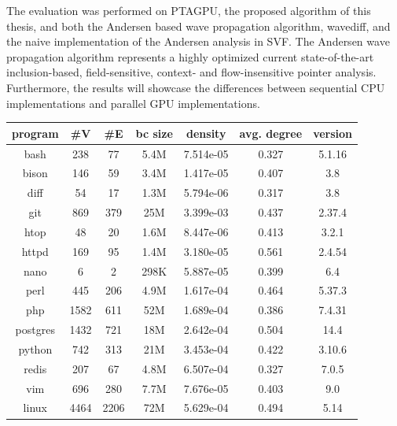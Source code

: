 The evaluation was performed on PTAGPU, the proposed algorithm of this thesis, and both the Andersen based wave propagation algorithm, wavediff, and the naive implementation of the Andersen analysis in SVF.
The Andersen wave propagation algorithm represents a highly optimized current state-of-the-art inclusion-based, field-sensitive, context- and flow-insensitive pointer analysis.
Furthermore, the results will showcase the differences between sequential CPU implementations and parallel GPU implementations.

\begin{table}
    \centering
    \begin{tabular}{||c c c c S[table-format = 1.3,retain-zero-exponent=true] c c||}
        \hline
        program       & \#V  & \#E  & bc size & {density} & avg. degree & version \\
        \hline\hline
        bash          & 238  & 77   & 5.4M    & 7.514e-05 & 0.327       & 5.1.16  \\
        bison         & 146  & 59   & 3.4M    & 1.417e-05 & 0.407       & 3.8     \\
        diff          & 54   & 17   & 1.3M    & 5.794e-06 & 0.317       & 3.8     \\
        git           & 869  & 379  & 25M     & 3.399e-03 & 0.437       & 2.37.4  \\
        htop          & 48   & 20   & 1.6M    & 8.447e-06 & 0.413       & 3.2.1   \\
        httpd         & 169  & 95   & 1.4M    & 3.180e-05 & 0.561       & 2.4.54  \\
        nano          & 6    & 2    & 298K    & 5.887e-05 & 0.399       & 6.4     \\ 
        perl          & 445  & 206  & 4.9M    & 1.617e-04 & 0.464       & 5.37.3  \\
        php           & 1582 & 611  & 52M     & 1.689e-04 & 0.386       & 7.4.31  \\
        postgres      & 1432 & 721  & 18M     & 2.642e-04 & 0.504       & 14.4    \\
        python        & 742  & 313  & 21M     & 3.453e-04 & 0.422       & 3.10.6  \\
        redis         & 207  & 67   & 4.8M    & 6.507e-04 & 0.327       & 7.0.5   \\
        vim           & 696  & 280  & 7.7M    & 7.676e-05 & 0.403       & 9.0     \\
        linux         & 4464 & 2206 & 72M     & 5.629e-04 & 0.494       & 5.14    \\

\end{tabular}
\end{table}
